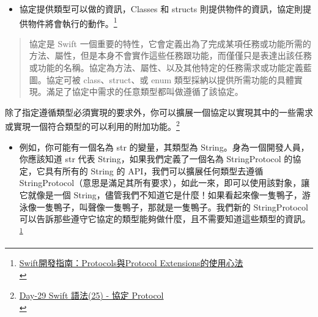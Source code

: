 \documentclass[a4paper,12pt]{article}
\begin{document}
\begin{itemize}
\item 協定提供類型可以做的資訊，Classes 和 structs 則提供物件的資訊，協定則提供物件將會執行的動作。\footnote{\href{https://www.appcoda.com.tw/swift-protocol/}{Swift開發指南：Protocols與Protocol Extensions的使用心法}\\\label{orgeca31e4}}\\
\end{itemize}
\begin{verse}
協定是 Swift 一個重要的特性，它會定義出為了完成某項任務或功能所需的方法、屬性，但是本身不會實作這些任務跟功能，而僅僅只是表達出該任務或功能的名稱。協定為方法、屬性、以及其他特定的任務需求或功能定義藍圖。協定可被 class、struct、或 enum 類型採納以提供所需功能的具體實現。滿足了協定中需求的任意類型都叫做遵循了該協定。\\
\end{verse}

除了指定遵循類型必須實現的要求外，你可以擴展一個協定以實現其中的一些需求或實現一個符合類型的可以利用的附加功能。\footnote{\href{https://ithelp.ithome.com.tw/articles/10197366}{Day-29 Swift 語法(25) - 協定 Protocol}\\}\\
\begin{itemize}
\item 例如，你可能有一個名為 str 的變量，其類型為 String。身為一個開發人員，你應該知道 str 代表 String，如果我們定義了一個名為 StringProtocol 的協定，它具有所有的 String 的 API，我們可以擴展任何類型去遵循 StringProtocol（意思是滿足其所有要求），如此一來，即可以使用該對象，讓它就像是一個 String，儘管我們不知道它是什麼！如果看起來像一隻鴨子，游泳像一隻鴨子，叫聲像一隻鴨子，那就是一隻鴨子。我們新的 StringProtocol 可以告訴那些遵守它協定的類型能夠做什麼，且不需要知道這些類型的資訊。\textsuperscript{\ref{orgeca31e4}}\\
\end{itemize}
\end{document}
